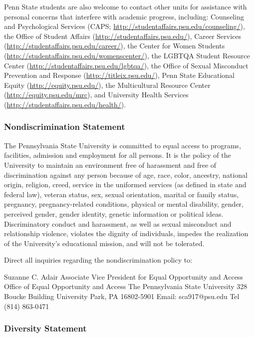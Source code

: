 \documentclass[
  letterpaper,
  DIV=11,
  numbers=noendperiod]{scrartcl}
\begin{document}
Penn State students are also welcome to contact other units for
assistance with personal concerns that interfere with academic progress,
including: Counseling and Psychological Services (CAPS;
\url{http://studentaffairs.psu.edu/counseling/}), the Office of Student
Affairs (\url{http://studentaffairs.psu.edu/}), Career Services
(\url{http://studentaffairs.psu.edu/career/}), the Center for Women
Students (\url{http://studentaffairs.psu.edu/womenscenter/}), the LGBTQA
Student Resource Center (\url{http://studentaffairs.psu.edu/lgbtqa/}),
the Office of Sexual Misconduct Prevention and Response
(\url{http://titleix.psu.edu/}), Penn State Educational Equity
(\url{http://equity.psu.edu/}), the Multicultural Resource Center
(\url{http://equity.psu.edu/mrc}), and University Health Services
(\url{http://studentaffairs.psu.edu/health/}).

\subsubsection*{Nondiscrimination
Statement}\label{non-discrimination-statement}

The Pennsylvania State University is committed to equal access to
programs, facilities, admission and employment for all persons. It is
the policy of the University to maintain an environment free of
harassment and free of discrimination against any person because of age,
race, color, ancestry, national origin, religion, creed, service in the
uniformed services (as defined in state and federal law), veteran
status, sex, sexual orientation, marital or family status, pregnancy,
pregnancy-related conditions, physical or mental disability, gender,
perceived gender, gender identity, genetic information or political
ideas.\\
Discriminatory conduct and harassment, as well as sexual misconduct and
relationship violence, violates the dignity of individuals, impedes the
realization of the University's educational mission, and will not be
tolerated.

Direct all inquiries regarding the nondiscrimination policy to:

Suzanne C. Adair Associate Vice President for Equal Opportunity and
Access Office of Equal Opportunity and Access The Pennsylvania State
University 328 Boucke Building University Park, PA 16802-5901 Email:
sca917@psu.edu Tel (814) 863-0471

\subsubsection*{Diversity Statement}\label{diversity-statement}
\end{document}
